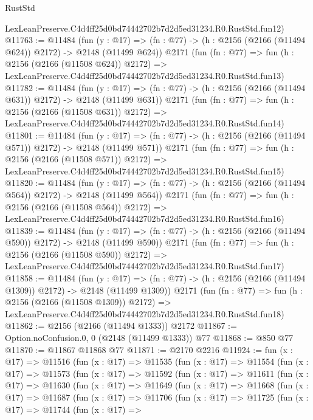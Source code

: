 \begin{lexlean}{RustStd}
\begin{coremodule}
    LexLeanPreserve.C4d4ff25d0bd74442702b7d2d5ed31234.R0.RustStd.fun12)
@11763 := @11484
    (fun (y : @17) => (fn : @77) -> (h : @2156 (@2166 (@11494 @624)) @2172) -> @2148 (@11499 @624))
    @2171
    (fun (fn : @77) =>
    fun (h : @2156 (@2166 (@11508 @624)) @2172) =>
    LexLeanPreserve.C4d4ff25d0bd74442702b7d2d5ed31234.R0.RustStd.fun13)
@11782 := @11484
    (fun (y : @17) => (fn : @77) -> (h : @2156 (@2166 (@11494 @631)) @2172) -> @2148 (@11499 @631))
    @2171
    (fun (fn : @77) =>
    fun (h : @2156 (@2166 (@11508 @631)) @2172) =>
    LexLeanPreserve.C4d4ff25d0bd74442702b7d2d5ed31234.R0.RustStd.fun14)
@11801 := @11484
    (fun (y : @17) => (fn : @77) -> (h : @2156 (@2166 (@11494 @571)) @2172) -> @2148 (@11499 @571))
    @2171
    (fun (fn : @77) =>
    fun (h : @2156 (@2166 (@11508 @571)) @2172) =>
    LexLeanPreserve.C4d4ff25d0bd74442702b7d2d5ed31234.R0.RustStd.fun15)
@11820 := @11484
    (fun (y : @17) => (fn : @77) -> (h : @2156 (@2166 (@11494 @564)) @2172) -> @2148 (@11499 @564))
    @2171
    (fun (fn : @77) =>
    fun (h : @2156 (@2166 (@11508 @564)) @2172) =>
    LexLeanPreserve.C4d4ff25d0bd74442702b7d2d5ed31234.R0.RustStd.fun16)
@11839 := @11484
    (fun (y : @17) => (fn : @77) -> (h : @2156 (@2166 (@11494 @590)) @2172) -> @2148 (@11499 @590))
    @2171
    (fun (fn : @77) =>
    fun (h : @2156 (@2166 (@11508 @590)) @2172) =>
    LexLeanPreserve.C4d4ff25d0bd74442702b7d2d5ed31234.R0.RustStd.fun17)
@11858 := @11484
    (fun (y : @17) =>
    (fn : @77) -> (h : @2156 (@2166 (@11494 @1309)) @2172) -> @2148 (@11499 @1309))
    @2171
    (fun (fn : @77) =>
    fun (h : @2156 (@2166 (@11508 @1309)) @2172) =>
    LexLeanPreserve.C4d4ff25d0bd74442702b7d2d5ed31234.R0.RustStd.fun18)
@11862 := @2156 (@2166 (@11494 @1333)) @2172
@11867 := Option.noConfusion.{0, 0} (@2148 (@11499 @1333)) @77
@11868 := @850 @77
@11870 := @11867 @11868 @77
@11871 := @2170 @2216
@11924 := fun (x : @17) =>
  @11516
    (fun (x : @17) =>
    @11535
      (fun (x : @17) =>
      @11554
        (fun (x : @17) =>
        @11573
          (fun (x : @17) =>
          @11592
            (fun (x : @17) =>
            @11611
              (fun (x : @17) =>
              @11630
                (fun (x : @17) =>
                @11649
                  (fun (x : @17) =>
                  @11668
                    (fun (x : @17) =>
                    @11687
                      (fun (x : @17) =>
                      @11706
                        (fun (x : @17) =>
                        @11725
                          (fun (x : @17) =>
                          @11744
                            (fun (x : @17) =>

\end{coremodule}
\end{lexlean}
